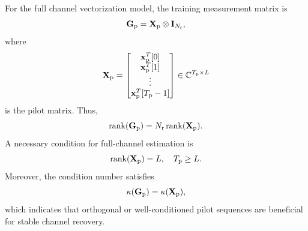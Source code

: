 \documentclass[journal]{IEEEtran}
\begin{document}
For the full channel vectorization model, the training measurement matrix is
\begin{equation}
\mathbf{G}_{\rm p}
=
\mathbf{X}_{\rm p}\otimes\mathbf{I}_{N_{\rm r}},
\label{eq:Gp_Xp_kron}
\end{equation}
where
\begin{equation}
\mathbf{X}_{\rm p}
=
\begin{bmatrix}
\mathbf{x}_{\rm p}^T[0]\\
\mathbf{x}_{\rm p}^T[1]\\
\vdots\\
\mathbf{x}_{\rm p}^T[T_{\rm p}-1]
\end{bmatrix}
\in\mathbb{C}^{T_{\rm p}\times L}
\end{equation}
is the pilot matrix. 
Thus,
\begin{equation}
\operatorname{rank}(\mathbf{G}_{\rm p})
=
N_{\rm r}\operatorname{rank}(\mathbf{X}_{\rm p}).
\label{eq:rank_Gp}
\end{equation}
A necessary condition for full-channel estimation is
\begin{equation}
\operatorname{rank}(\mathbf{X}_{\rm p})=L,
\quad
T_{\rm p}\geq L.
\label{eq:pilot_full_rank_condition}
\end{equation}
Moreover, the condition number satisfies
\begin{equation}
\kappa(\mathbf{G}_{\rm p})
=
\kappa(\mathbf{X}_{\rm p}),
\label{eq:kappa_Gp}
\end{equation}
which indicates that orthogonal or well-conditioned pilot sequences are beneficial for stable channel recovery.
\end{document}
